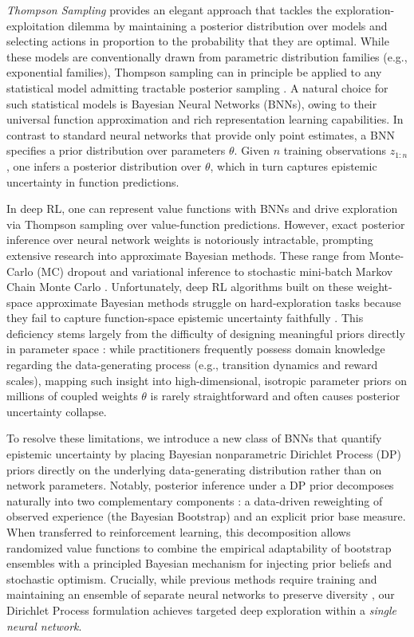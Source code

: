 \documentclass[10pt]{article}
\begin{document}
\textit{Thompson Sampling} \citep{thompson1933likelihood, russo2018tutorial, riquelme2018deep} provides an elegant approach that tackles the exploration-exploitation dilemma by maintaining a posterior distribution over models and selecting actions in proportion to the probability that they are optimal. While these models are conventionally drawn from parametric distribution families (e.g., exponential families), Thompson sampling can in principle be applied to any statistical model admitting tractable posterior sampling \citep{riquelme2018deep}. A natural choice for such statistical models is Bayesian Neural Networks (BNNs), owing to their universal function approximation and rich representation learning capabilities. In contrast to standard neural networks that provide only point estimates, a BNN specifies a prior distribution over parameters $\theta$. Given $n$ training observations $z_{1:n}$, one infers a posterior distribution over $\theta$, which in turn captures epistemic uncertainty in function predictions.

In deep RL, one can represent value functions with BNNs and drive exploration via Thompson sampling over value-function predictions. However, exact posterior inference over neural network weights is notoriously intractable, prompting extensive research into approximate Bayesian methods. These range from Monte-Carlo (MC) dropout \citep{gal2016dropout} and variational inference \citep{blundell2015weight} to stochastic mini-batch Markov Chain Monte Carlo \citep{neal2012bayesian}. Unfortunately, deep RL algorithms built on these weight-space approximate Bayesian methods struggle on hard-exploration tasks because they fail to capture function-space epistemic uncertainty faithfully \citep{osband2018randomized}. This deficiency stems largely from the difficulty of designing meaningful priors directly in parameter space \citep{arbel2023primer}: while practitioners frequently possess domain knowledge regarding the data-generating process (e.g., transition dynamics and reward scales), mapping such insight into high-dimensional, isotropic parameter priors on millions of coupled weights $\theta$ is rarely straightforward and often causes posterior uncertainty collapse.

To resolve these limitations, we introduce a new class of BNNs that quantify epistemic uncertainty by placing Bayesian nonparametric Dirichlet Process (DP) priors directly on the underlying data-generating distribution rather than on network parameters. Notably, posterior inference under a DP prior decomposes naturally into two complementary components \citep{vashishtha2026bayesian, vashishtha2025leveraging}: a data-driven reweighting of observed experience (the Bayesian Bootstrap) and an explicit prior base measure. When transferred to reinforcement learning, this decomposition allows randomized value functions to combine the empirical adaptability of bootstrap ensembles \citep{osband2016deep} with a principled Bayesian mechanism for injecting prior beliefs and stochastic optimism. Crucially, while previous methods require training and maintaining an ensemble of separate neural networks to preserve diversity \citep{osband2018randomized}, our Dirichlet Process formulation achieves targeted deep exploration within a \emph{single neural network}.
\end{document}
